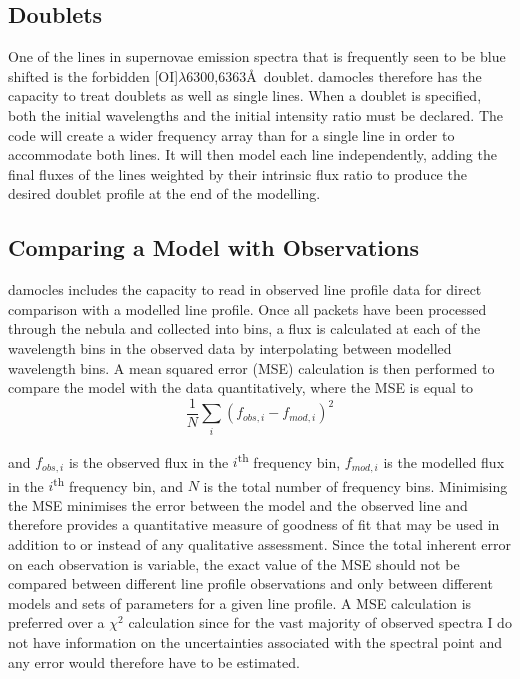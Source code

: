         \subsection{Doublets}

        One of the lines in supernovae emission spectra that is frequently seen to be blue shifted is the forbidden [OI]$\lambda$6300,6363\AA\ doublet.  {\sc damocles} therefore has the capacity to treat doublets as well as single lines.  When a doublet is specified, both the initial wavelengths and the initial intensity ratio must be declared.  The code will create a wider frequency array than for a single line in order to accommodate both lines.  It will then model each line independently, adding the final fluxes of the lines weighted by their intrinsic flux ratio to produce the desired doublet profile at the end of the modelling. 

        \subsection{Comparing a Model with Observations}

        {\sc damocles} includes the capacity to read in observed line profile data for direct comparison with a modelled line profile.  Once all packets have been processed through the nebula and collected into bins, a flux is calculated at each of the wavelength bins in the observed data by interpolating between modelled wavelength bins.  A mean squared error (MSE) calculation is then performed to compare the model with the data quantitatively, where the MSE is equal to	
        \begin{equation}
        \label{eqn:chi2}
        \frac{1}{N} \sum_i (f_{obs,i}- f_{mod,i})^2
        \end{equation}		
        
        \noindent and $f_{obs,i}$ is the observed flux in the $i$\textsuperscript{th} frequency bin, $f_{mod,i}$ is the modelled flux in the $i$\textsuperscript{th} frequency bin, and $N$ is the total number of frequency bins.   Minimising the MSE minimises the error between the model and the observed line and therefore provides a quantitative measure of goodness of fit that may be used in addition to or instead of any qualitative assessment.  Since the total inherent error on each observation is variable, the exact value of the MSE should not be compared between different line profile observations and only between different models and sets of parameters for a given line profile.  A MSE calculation is preferred over a $\chi^2$ calculation since for the vast majority of observed spectra I do not have information on the uncertainties associated with the spectral point and any error would therefore have to be estimated.
        
